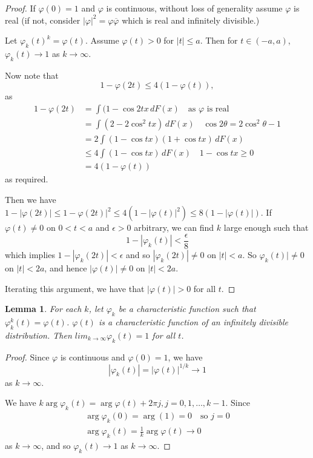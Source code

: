 \documentclass[10pt, oneside, reqno]{amsart}
\theoremstyle{plain}%
\newtheorem{lem}[thm]{Lemma}
\theoremstyle{definition}
\theoremstyle{remark}
\renewcommand{\phi}{\varphi}
\begin{document}
\begin{proof}
    If $\phi(0) = 1$ and $\phi$ is continuous, without loss of generality assume $\phi$ is real (if not, consider $|\phi|^2 = \phi \overline\phi$ which is real and infinitely divisible.)  
    
    Let $\phi_k(t)^k = \phi(t)$.  Assume $\phi(t) > 0$ for $|t| \leq a$.  Then for $t \in (-a, a)$, $\phi_k(t) \rightarrow 1$ as $k \rightarrow \infty$. 
    
    Now note that \[
        1 - \phi(2t) \leq 4(1 - \phi(t)), \tag{$\star$}
    \] as \begin{align*}
        1 - \phi(2t)    &= \int (1 - \cos 2tx  \, dF(x) \quad \text{as $\phi$ is real }\\
                        &= \int (2 -  2\cos^2 tx) \, dF(x) \quad \cos 2 \theta = 2 \cos^2 \theta - 1 \\
                        &= 2  \int(1- \cos tx) (1 + \cos tx) \, dF(x) \\
                        &\leq 4\int(1 - \cos tx) \, dF(x) \quad 1 - \cos tx \geq 0 \\
                        &= 4(1 - \phi(t))
    \end{align*} as required.

    Then we have $1 - |\phi(2t)| \leq 1 - \phi(2t)|^2 \leq 4(1 - |\phi(t)|^2) \leq 8(1 - |\phi(t)|)$.  If $\phi(t) \neq 0$ on $0 < t < a$ and $\epsilon > 0$ arbitrary, we can find $k$ large enough such that \[
        1 - |\phi_k(t)| < \frac{\epsilon}{8}
    \]  which implies $1 - |\phi_k(2t)| < \epsilon$ and so $|\phi_k(2t)| \neq 0 $ on $|t| < a$.  So $\phi_k(t)| \neq 0$ on $|t| < 2a$, and hence $|\phi(t)| \neq 0$ on $|t| < 2a$.  
    
    Iterating this argument, we have that $|\phi(t)| > 0$ for all $t$.  
\end{proof}

\begin{lem}
    \label{lem:infd3}
    For each $k$, let $\phi_k$ be a characteristic function such that $\phi_k^k(t) = \phi(t)$.  $\phi(t)$ is a characteristic function of an infinitely divisible distribution.  Then $lim_{k \rightarrow \infty} \phi_k(t) = 1$ for all $t$.  
\end{lem}
\begin{proof}
    Since $\phi$ is continuous and $\phi(0) = 1$, we have \[
        | \phi_k(t) | = |\phi(t)|^{1/k} \rightarrow 1 
    \] as $k \rightarrow \infty$.  
    
    We have $k \arg \phi_k(t) = \arg \phi(t) + 2 \pi j, j = 0, 1, \dots, k-1$.  Since \begin{align*}
        \arg \phi_k(0) = \arg(1) = 0 \quad \text{so $j = 0$} \\
        \arg \phi_k(t) = \frac{1}{k} \arg \phi(t) \rightarrow 0 
    \end{align*} as $k \rightarrow \infty$, and so $\phi_k(t) \rightarrow 1$ as $k \rightarrow \infty$.  
\end{proof}
\end{document}
